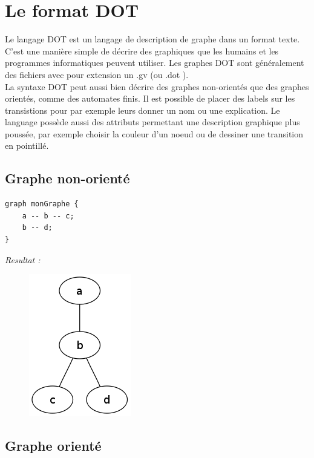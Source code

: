 \documentclass[12pt,a4paper]{report}
\begin{document}
\section{Le format DOT}

  Le langage DOT est un langage de description de graphe dans un format texte. C'est une manière simple de décrire des graphiques que les humains et les programmes informatiques peuvent utiliser. Les graphes DOT sont généralement des fichiers avec pour extension un .gv (ou .dot ).\\

  La syntaxe DOT peut aussi bien décrire des graphes non-orientés que des graphes orientés, comme des automates finis.
  Il est possible de placer des labels sur les transistions pour par exemple leurs donner un nom ou une explication. Le language possède aussi des attributs permettant une description graphique plus poussée, par exemple choisir la couleur d'un noeud ou de dessiner une transition en pointillé.

\subsection{Graphe non-orienté}

\begin{lstlisting}
graph monGraphe {
    a -- b -- c;
    b -- d;
}
\end{lstlisting}

  \textit{Resultat : }

\begin{figure}[!h]
  \centering
  \includegraphics[scale=0.3]{ressources/grapheNO.png}
\end{figure}

\subsection{Graphe orienté}
\end{document}
